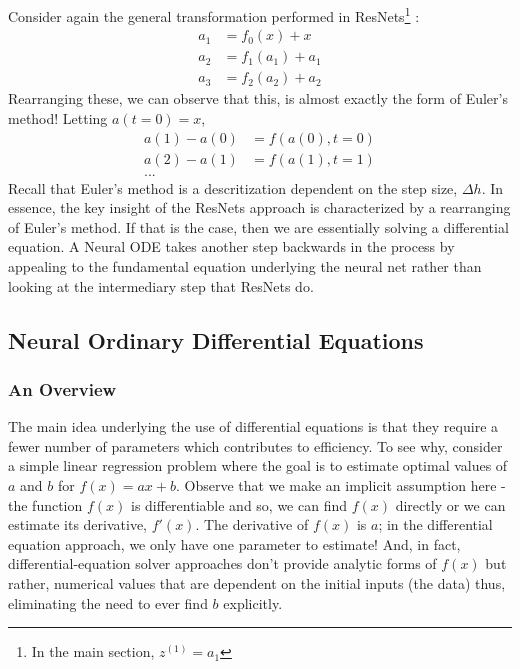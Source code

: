 \documentclass{article}
\begin{document}
\noindent Consider again the general transformation performed in ResNets\footnote{In the main section, $z^{(1)} = a_1$} \cite{rajat}:
\begin{align}
    a_1 &= f_{0}(x) + x\\
    a_2 &= f_{1}(a_{1}) + a_{1}\\
    a_3 &= f_{2}(a_{2}) + a_{2}
\end{align}
\noindent Rearranging these, we can observe that this, is almost exactly the form of Euler's method! Letting $a(t = 0) = x$,
\begin{align}
    a(1) - a(0) &= f(a(0), t = 0)\\
    a(2) - a(1) &= f(a(1), t = 1)\\
    ...
\end{align}
\noindent Recall that Euler's method is a descritization dependent on the step size, $\Delta h$. In essence, the key insight of the ResNets approach is characterized by a rearranging of Euler's method. If that is the case, then we are essentially solving a differential equation. A Neural ODE takes another step backwards in the process by appealing to the fundamental equation underlying the neural net rather than looking at the intermediary step that ResNets do.

\subsection{Neural Ordinary Differential Equations}
\label{sec:neuralODE}
\subsubsection{An Overview}

\noindent The main idea underlying the use of differential equations is that they require a fewer number of parameters which contributes to efficiency. To see why, consider a simple linear regression problem where the goal is to estimate optimal values of $a$ and $b$ for $f(x) = ax + b$. Observe that we make an implicit assumption here - the function $f(x)$ is differentiable and so, we can find $f(x)$ directly or we can estimate its derivative, $f'(x)$. The derivative of $f(x)$ is $a$; in the differential equation approach, we only have one parameter to estimate! And, in fact, differential-equation solver approaches don't provide analytic forms of $f(x)$ but rather, numerical values that are dependent on the initial inputs (the data) thus, eliminating the need to ever find $b$ explicitly. 
\end{document}
